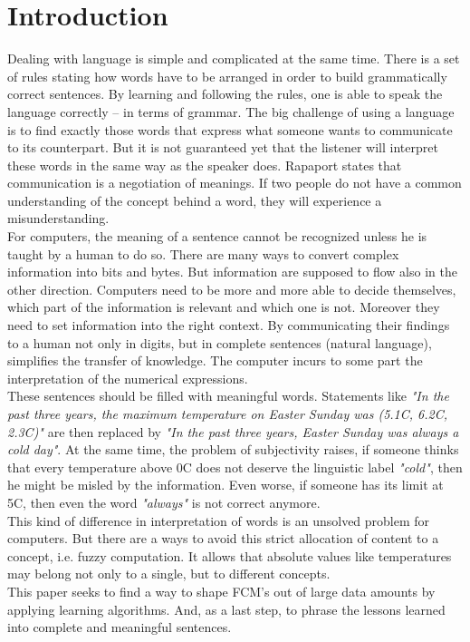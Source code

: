 \documentclass[conference]{IEEEtran}
\begin{document}
\section{Introduction}
Dealing with language is simple and complicated at the same time. There is a set of rules stating how words have to be arranged in order to build grammatically correct sentences. By learning and following the rules, one is able to speak the language correctly -- in terms of grammar. The big challenge of using a language is to find exactly those words that express what someone wants to communicate to its counterpart. But it is not guaranteed yet that the listener will interpret these words in the same way as the speaker does. Rapaport \cite{Rapaport2003} states that communication is a negotiation of meanings. If two people do not have a common understanding of the concept behind a word, they will experience a misunderstanding.\\
For computers, the meaning of a sentence cannot be recognized unless he is taught by a human to do so. There are many ways to convert complex information into bits and bytes. But information are supposed to flow also in the other direction. Computers need to be more and more able to decide themselves, which part of the information is relevant and which one is not. Moreover they need to set information into the right context. By communicating their findings to a human not only in digits, but in complete sentences (natural language), simplifies the transfer of knowledge. The computer incurs to some part the interpretation of the numerical expressions.\\
These sentences should be filled with meaningful words. Statements like \emph{"In the past three years, the maximum temperature on Easter Sunday was (5.1\degree C, 6.2\degree C, 2.3\degree C)"} are then replaced by \emph{"In the past three years, Easter Sunday was always a cold day"}. At the same time, the problem of subjectivity raises, if someone thinks that every temperature above 0\degree C does not deserve the linguistic label \emph{"cold"}, then he might be misled by the information. Even worse, if someone has its limit at 5\degree C, then even the word \emph{"always"} is not correct anymore.\\
This kind of difference in interpretation of words is an unsolved problem for computers. But there are a ways to avoid this strict allocation of content to a concept, i.e. fuzzy computation. It allows that absolute values like temperatures may belong not only to a single, but to different concepts.\\
This paper seeks to find a way to shape FCM's out of large data amounts by applying learning algorithms. And, as a last step, to phrase the lessons learned into complete and meaningful sentences.\\
\end{document}
